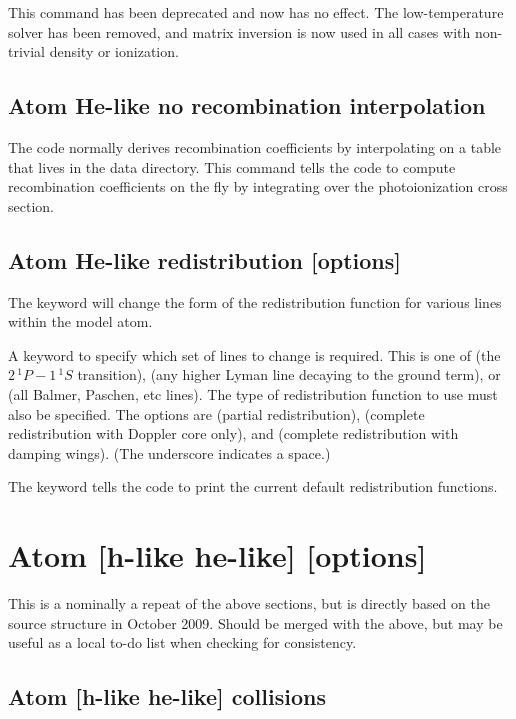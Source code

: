 This command has been deprecated and now has no effect.  The low-temperature solver has been removed,
and matrix inversion is now used in all cases with non-trivial density or ionization.

\subsection{Atom He-like no recombination interpolation}

The code normally derives recombination coefficients by interpolating
on a table that lives in the data directory.
This command tells the code
to compute recombination coefficients on the fly by integrating over the
photoionization cross section.

\subsection{Atom He-like redistribution [options]}

The keyword  will change the form
of the redistribution
function for various lines within the model atom.

A keyword to specify which set of lines to change is required.
This
is one of  (the $2\, ^1P - 1\, ^1S$ transition),
 (any higher Lyman
line decaying to the ground term),
or  (all Balmer, Paschen,
etc lines).
The type of redistribution function to use must also be
specified.
The options are  (partial redistribution),
 (complete
redistribution with Doppler core only),
and  (complete redistribution
with damping wings).
(The underscore indicates a space.)

The keyword  tells the code to print the current default
redistribution functions.

\section{Atom [h-like \OR{} he-like] [options]}

This is a nominally a repeat of the above sections, but is directly
based on the source structure in October 2009.  Should be merged with
the above, but may be useful as a local to-do list when checking for
consistency.


\subsection{Atom [h-like \OR{} he-like] collisions}

